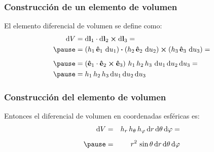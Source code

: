 \documentclass[12pt]{beamer}
\begin{document}
\begin{frame}
\frametitle{Construcción de un elemento de volumen}
El elemento diferencial de volumen se define como:
\pause
\begin{eqnarray*}
\begin{aligned}
\dd{V} &= \dd{\vb{l}_{1}} \cdot \dd{\vb{l}_{2}} \cp \dd{\vb{l}_{3}} = \\ \pause
&= \left( h_{1} \, \vu{e}_{1} \, \dd{u}_{1} \right) \vdot \left( h_{2} \, \vu{e}_{2} \, \dd{u}_{2} \right) \cp \left( h_{3} \, \vu{e}_{3} \, \dd{u}_{3} \right) =  \\[0.5em] \pause
&= \left( \vu{e}_{1} \cdot \vu{e}_{2} \cp \vu{e}_{3} \right) \, h_{1} \, h_{2} \, h_{3} \, \dd{u_{1}} \dd{u_{2}} \dd{u_{3}} = \\ \pause
&= h_{1} \, h_{2} \, h_{3} \dd{u_{1}} \dd{u_{2}} \dd{u_{3}}
\end{aligned}
\end{eqnarray*}
\end{frame}
\begin{frame}
\frametitle{Construcción del elemento de volumen}
Entonces el diferencial de volumen en coordenadas esféricas es:
\pause
\begin{eqnarray*}
\dd{V} &=& h_{r} \, h_{\theta} \, h_{\varphi} \dd{r} \dd{\theta} \dd{\varphi} = \\[0.5em] \pause
&=& r^{2} \, \sin \theta \dd{r} \dd{\theta} \dd{\varphi}
\end{eqnarray*}
\end{frame}
\end{document}
